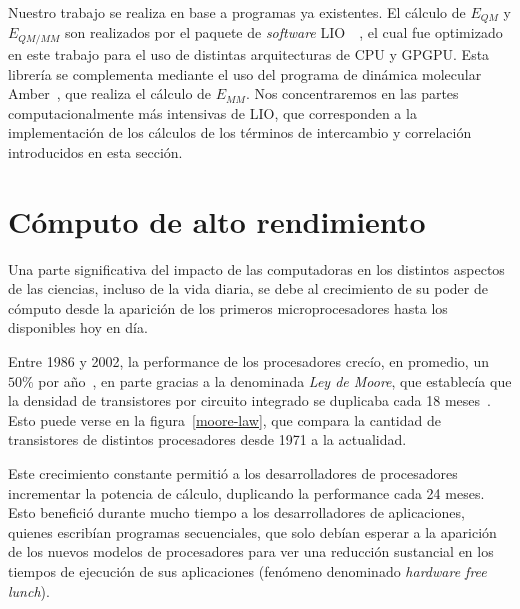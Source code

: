 Nuestro trabajo se realiza en base a programas ya existentes. El c\'alculo de $E_{QM}$ y $E_{QM/MM}$ son realizados por el paquete de
\textit{software} LIO~\cite{LIO}~\cite{TesisNitsche}, el cual fue optimizado en este trabajo para el uso de
distintas arquitecturas de CPU y GPGPU. Esta librer\'ia
se complementa mediante el uso del programa de din\'amica molecular Amber~\cite{Amber}, que realiza el c\'alculo
de $E_{MM}$. Nos concentraremos en las partes computacionalmente m\'as intensivas de LIO, que corresponden a la
implementaci\'on de los c\'alculos de los términos de intercambio y correlación introducidos en esta secci\'on.

\section{C\'omputo de alto rendimiento}

Una parte significativa del impacto de las computadoras en los distintos aspectos de las ciencias, incluso de la vida diaria, se debe al crecimiento de su poder de c\'omputo desde la aparici\'on de los primeros microprocesadores hasta los disponibles hoy en d\'ia.

Entre 1986 y 2002, la performance de los procesadores crec\'io, en promedio, un $50\%$ por a\~no~\cite{Pacheco}, en parte gracias a la denominada \textit{Ley de Moore}, que
establec\'ia que la densidad de transistores por circuito integrado se duplicaba cada 18 meses~\cite{HennessyPatterson}. 
Esto puede verse en la figura~\ref{moore-law}, que compara la cantidad de transistores de distintos procesadores desde 1971 a la actualidad.

Este crecimiento constante permiti\'o a los desarrolladores de procesadores incrementar la potencia de c\'alculo, duplicando la performance cada 24 meses. 
Esto benefici\'o durante mucho tiempo a los desarrolladores de aplicaciones, quienes escrib\'ian programas secuenciales, que solo deb\'ian esperar a la aparici\'on de los nuevos modelos de procesadores para ver una reducci\'on sustancial en los tiempos de ejecuci\'on de sus aplicaciones (fen\'omeno denominado \textit{hardware free lunch}).

